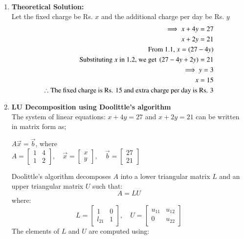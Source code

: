 \documentclass[journal]{IEEEtran}
\begin{document}
\begin{enumerate}
    \item \textbf{Theoretical Solution:}\\ 
    Let the fixed charge be Rs. $x$ and the additional charge per day be Rs. $y$ \\
    \begin{align}
        \implies x+4y=27\\
        x+2y=21\\
        \text{From 1.1, }x=\left(27-4y\right)\\
        \text{Substituting $x$ in 1.2, we get  }\left(27-4y+2y\right)=21\\
        \implies y=3\\
        x=15\\
        \therefore \text{The fixed charge is Rs. 15 and extra charge per day is Rs. 3}
    \end{align}
    \item \textbf{LU Decomposition using Doolittle's algorithm}\\
    The system of linear equations: $x+4y=27$ and $x+2y=21$ can be written in matrix form as;\\
    \begin{center}
        $A\Vec{x} = \Vec{b}$, where\\
        \vspace{0.5cm}
        $A = \begin{bmatrix} 
1 & 4 \\ 
1 & 2 
\end{bmatrix}, \quad
\Vec{x} =
\begin{bmatrix} 
x \\ 
y 
\end{bmatrix}, 
\quad
 \Vec{b} =
\begin{bmatrix} 
27 \\ 
21 
\end{bmatrix}
$
    \end{center}
    Doolittle's algorithm decomposes $A$ into a lower triangular matrix $L$ and an upper triangular matrix $U$ such that:
\[
A = LU
\]
where:
\[
L =
\begin{bmatrix} 
1 & 0 \\ 
l_{21} & 1
\end{bmatrix},
\quad
U =
\begin{bmatrix} 
u_{11} & u_{12} \\ 
0 & u_{22}
\end{bmatrix}
\]
The elements of \( L \) and \( U \) are computed using:
\begin{align}

\end{align}
\end{enumerate}
\end{document}
